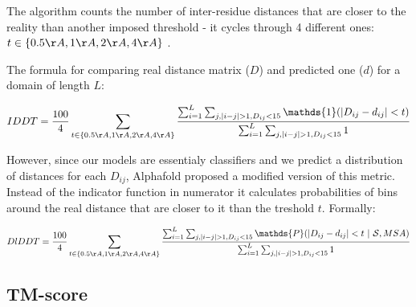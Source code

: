 The algorithm counts the number of inter-residue distances that are closer to the reality than another imposed threshold - it cycles through 4 different ones: $t \in \{0.5\AA, 1\AA, 2\AA, 4\AA\}$ \cite{lddt}.

The formula for comparing real distance matrix ($D$) and predicted one ($d$) for a domain of length $L$:

$$IDDT = \frac{100}{4} \sum_{t \in \{0.5\AA, 1\AA, 2\AA, 4\AA\}} \frac
{\sum_{i = 1}^L \sum_{j, |i - j| > 1, D_{ij} < 15} \mathds{1}(|D_{ij} - d_{ij}| < t)}
{\sum_{i = 1}^L \sum_{j, |i - j| > 1, D_{ij} < 15} 1} $$

However, since our models are essentialy classifiers and we predict a distribution of distances for each $D_{ij}$, Alphafold proposed a modified version of this metric. Instead of the indicator function in numerator it calculates probabilities of bins around the real distance that are closer to it than the treshold $t$. Formally:

\begin{equation}
DlDDT = \frac{100}{4} \sum_{t \in \{0.5\AA, 1\AA, 2\AA, 4\AA\}} \frac
{\sum_{i = 1}^L \sum_{j, |i - j| > 1, D_{ij} < 15} \mathds{P}(|D_{ij} - d_{ij}| < t~|~ \mathcal{S}, MSA)}
{\sum_{i = 1}^L \sum_{j, |i - j| > 1, D_{ij} < 15} 1}
    \label{eq:dlddt}
\end{equation}

\subsection{TM-score}





